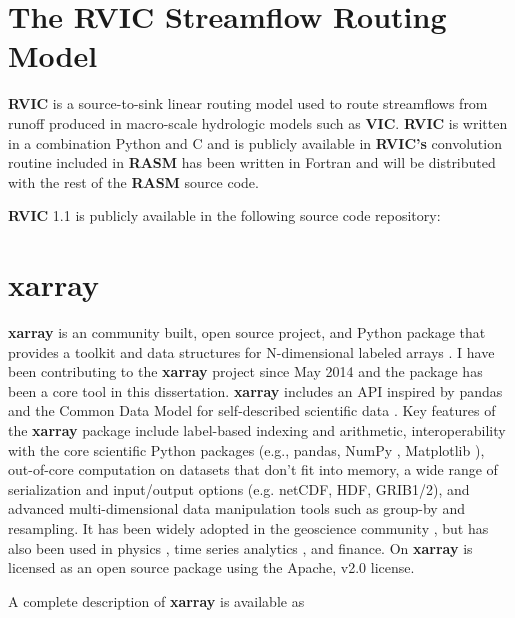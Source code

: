 \section{The RVIC Streamflow Routing Model}
\label{sec:rvic_dev}

\textbf{RVIC} is a source-to-sink linear routing model used to route streamflows from runoff produced in macro-scale hydrologic models such as \textbf{VIC}.
\textbf{RVIC} is written in a combination Python and C and is publicly available in \citet{Hamman_2015}
\textbf{RVIC's} convolution routine included in \textbf{RASM} has been written in Fortran and will be distributed with the rest of the \textbf{RASM} source code.

\textbf{RVIC} 1.1 is publicly available in the following source code repository:


\section{xarray}
\label{sec:xarray_dev}

\textbf{xarray} is an community built, open source project, and Python package that provides a toolkit and data structures for N-dimensional labeled arrays \citep{Hoyer_2016}.
I have been contributing to the \textbf{xarray} project since May 2014 and the package has been a core tool in this dissertation.
\textbf{xarray} includes an API inspired by pandas \citep{mckinney_2010} and the Common Data Model for self-described scientific data \citep{Rew_1990,Brown_1993}.
Key features of the \textbf{xarray} package include label-based indexing and arithmetic, interoperability with the core scientific Python packages (e.g., pandas, NumPy \citep{Jones_2001}, Matplotlib \citep{van_der_Walt_2011}), out-of-core computation on datasets that don't fit into memory, a wide range of serialization and input/output options (e.g. netCDF, HDF, GRIB1/2), and advanced multi-dimensional data manipulation tools such as group-by and resampling.
It has been widely adopted in the geoscience community \citep[e.g.][]{xgcm,Dawson_2016a,Dawson_2016b}, but has also been used in physics \citep[e.g.][]{pycalphad}, time series analytics \citep{cesium}, and finance.
On
\textbf{xarray} is licensed as an open source package using the Apache, v2.0 license.

A complete description of \textbf{xarray} is available as

